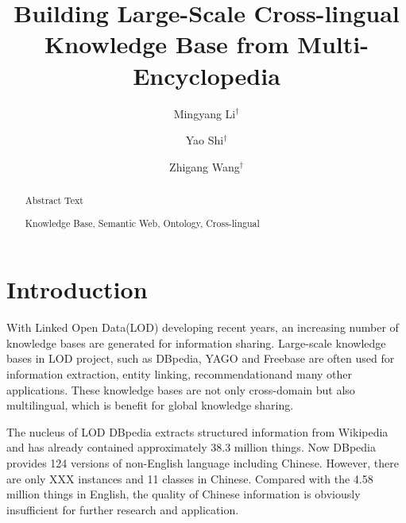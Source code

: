 \documentclass[runningheads,a4paper]{llncs}
\newcommand{\keywords}[1]{\par\addvspace\baselineskip\noindent\keywordname\enspace\ignorespaces#1}
\begin{document}
\mainmatter

\title{Building Large-Scale Cross-lingual Knowledge Base from Multi-Encyclopedia}
\author{Mingyang Li$^\dag$ \and Yao Shi$^\dag$ \and Zhigang Wang$^\dag$}


\maketitle

\begin{abstract}
    Abstract Text

\keywords{Knowledge Base, Semantic Web, Ontology, Cross-lingual}
\end{abstract}

\section{Introduction}
With Linked Open Data(LOD) developing recent years, an increasing number of knowledge bases are generated for information sharing. Large-scale knowledge bases in LOD project, such as DBpedia\cite{mendes2012dbpedia}, YAGO\cite{mahdisoltani2014yago3} and Freebase\cite{bollacker2008freebase} are often used for information extraction\cite{dutta2013integrating}, entity linking\cite{shen2012linden}, recommendation\cite{passant2010dbrec,fernandez2011generic,kaminskas2012knowledge}and many other applications. These knowledge bases are not only cross-domain but also multilingual, which is benefit for global knowledge sharing.

 The nucleus of LOD DBpedia extracts structured information from Wikipedia and has already contained approximately 38.3 million things. Now DBpedia provides 124 versions of non-English language including Chinese. However, there are only XXX instances and 11 classes in Chinese. Compared with the 4.58 million things in English, the quality of Chinese information is obviously insufficient for further research and application.
\end{document}
